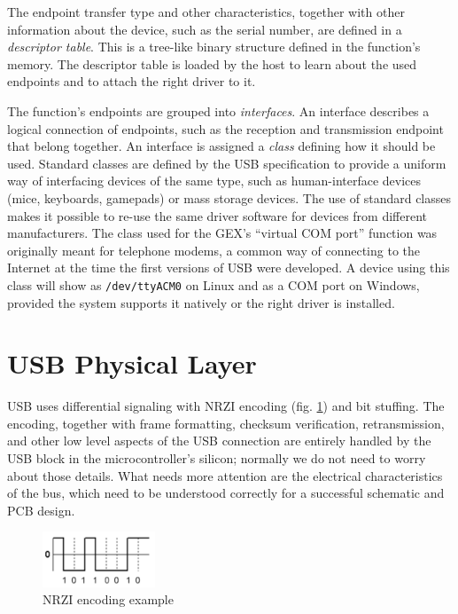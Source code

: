 The endpoint transfer type and other characteristics, together with other information about the device, such as the serial number, are defined in a \textit{descriptor table}. This is a tree-like binary structure defined in the function's memory. The descriptor table is loaded by the host to learn about the used endpoints and to attach the right driver to it.

The function's endpoints are grouped into \textit{interfaces}. An interface describes a logical connection of endpoints, such as the reception and transmission endpoint that belong together. An interface is assigned a \textit{class} defining how it should be used. Standard classes are defined by the USB specification to provide a uniform way of interfacing devices of the same type, such as human-interface devices (mice, keyboards, gamepads) or mass storage devices. The use of standard classes makes it possible to re-use the same driver software for devices from different manufacturers. The class used for the GEX's ``virtual COM port'' function was originally meant for telephone modems, a common way of connecting to the Internet at the time the first versions of USB were developed. A device using this class will show as \verb|/dev/ttyACM0| on Linux and as a COM port on Windows, provided the system supports it natively or the right driver is installed.



\newpage


\section{USB Physical Layer}

\gls{USB} uses differential signaling with \gls{NRZI} encoding (fig. \ref{fig:nrzi}) and bit stuffing. The encoding, together with frame formatting, checksum verification, retransmission, and other low level aspects of the \gls{USB} connection are entirely handled by the \gls{USB} block in the microcontroller's silicon; normally we do not need to worry about those details. What needs more attention are the electrical characteristics of the bus, which need to be understood correctly for a successful schematic and \gls{PCB} design.

\begin{figure}
	\centering
	\includegraphics[width=0.3\textwidth]{img/usb-nrzi-diagram.png}
	\caption{\label{fig:nrzi}NRZI encoding example}
\end{figure}

